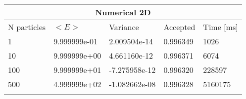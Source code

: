 \begin{tabular}{|l|l|l|l|l|}
\hline 
\multicolumn{5}{|c|}{Numerical 2D}\\ 
\hline 
N particles & $<E>$ & Variance & Accepted & Time [ms]\\ 
 \hline 
1 & 9.999999e-01 & 2.009504e-14 & 0.996349 & 1026 \\ \hline 
10 & 9.999999e+00 & 4.661160e-12 & 0.996371 & 6074 \\ \hline 
100 & 9.999999e+01 & -7.275958e-12 & 0.996320 & 228597 \\ \hline 
500 & 4.999999e+02 & -1.082662e-08 & 0.996328 & 5160175 \\ \hline 
\label{i:n2} 
\end{tabular}
